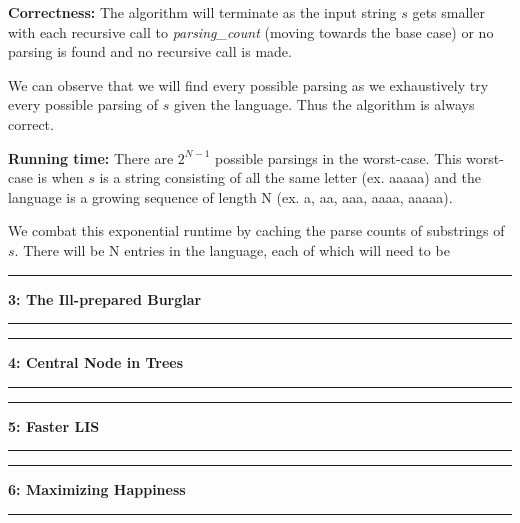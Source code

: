 \documentclass[11pt]{article}
\newcommand\question[2]{\vspace{.25in}\hrule\textbf{#1: #2}\vspace{.5em}\hrule\vspace{.10in}}
\newcommand\correctness{\vspace{.10in}\textbf{Correctness: }}
\newcommand\runtime{\vspace{.10in}\textbf{Running time: }}
\begin{document}
\correctness The algorithm will terminate as the input string $s$ gets smaller with each recursive call to \textit{parsing\_count} (moving towards the base case) or no parsing is found and no recursive call is made.

We can observe that we will find every possible parsing as we exhaustively try every possible parsing of $s$ given the language. Thus the algorithm is always correct. 

\runtime There are $2^{N-1}$ possible parsings in the worst-case. This worst-case is when $s$ is a string consisting of all the same letter (ex. aaaaa) and the language is a growing sequence of length N (ex. a, aa, aaa, aaaa, aaaaa).

 We combat this exponential runtime by caching the parse counts of substrings of $s$. There will be N entries in the language, each of which will need to be

\question{3}{The Ill-prepared Burglar}

\question{4}{Central Node in Trees}

\question{5}{Faster LIS}

\question{6}{Maximizing Happiness}
\end{document}
